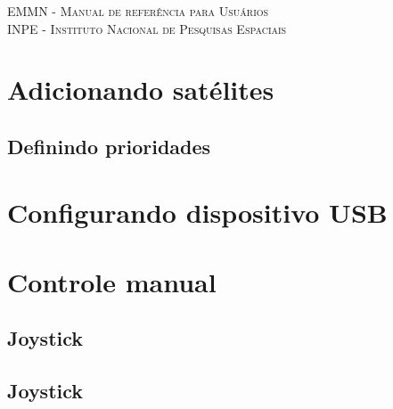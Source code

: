 \documentclass[12pt, a4paper]{article}
\begin{document}
\begin{center}
    \textsc{EMMN - Manual de referência para Usuários} \\
    \textsc{INPE - Instituto Nacional de Pesquisas Espaciais}
\end{center}

\section{Adicionando satélites}
\subsection{Definindo prioridades}
\section{Configurando dispositivo USB}
\section{Controle manual}
\subsection{Joystick}
\subsection{Joystick}
\end{document}
